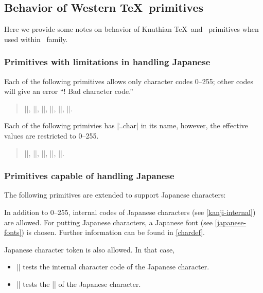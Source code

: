 \documentclass[a4paper,11pt,dvipdfmx]{article}
\begin{document}

\subsection{Behavior of Western \TeX\ primitives}

Here we provide some notes on behavior of Knuthian \TeX\ and \eTeX\ primitives
when used within \pTeX\ family.

\subsubsection{Primitives with limitations in handling Japanese}

Each of the following primitives allows only character codes 0--255;
other codes will give an error ``! Bad character code.''
\begin{quote}
 |\catcode|,
 |\sfcode|,
 |\mathcode|,
 |\delcode|,
 |\lccode|,
 |\uccode|.
\end{quote}

Each of the following primivies has |\...char| in its name,
however, the effective values are restricted to 0--255.
\begin{quote}
 |\endlinechar|,
 |\newlinechar|,
 |\escapechar|,
 ||,
 ||.
\end{quote}

\subsubsection{Primitives capable of handling Japanese}

The following primitives are extended to support Japanese characters:
\begin{cslist}
 \csitem[\.{char} <character code>,
   \.{chardef} <control sequence>=<character code>]
  In addition to 0--255, internal codes of Japanese characters
  (see \ref{kanji-internal}) are allowed.
  For putting Japanese characters, a Japanese font
  (see \ref{japanese-fonts}) is chosen.
  Further information can be found in \ref{chardef}.


 \csitem[\.{accent} <character code>=<character>]

  Japanese character token is also allowed.
  In that case,
  \begin{itemize}
    \item |\if| tests the internal character code of the Japanese character.
    \item |\ifcat| tests the |\kcatcode| of the Japanese character.
  \end{itemize}
\end{cslist}
\end{document}
